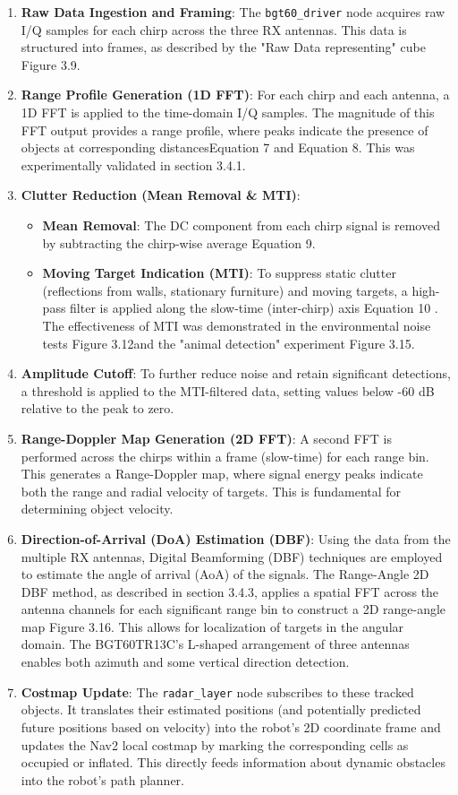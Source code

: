 \begin{itemize}
\begin{enumerate}
    \item \textbf{Raw Data Ingestion and Framing}: The \texttt{bgt60\_driver} node acquires raw I/Q samples for each chirp across the three RX antennas. This data is structured into frames, as described by the "Raw Data representing" cube Figure 3.9.
    \item \textbf{Range Profile Generation (1D FFT)}: For each chirp and each antenna, a 1D FFT is applied to the time-domain I/Q samples. The magnitude of this FFT output provides a range profile, where peaks indicate the presence of objects at corresponding distancesEquation 7 and Equation 8. This was experimentally validated in section 3.4.1.
    \item \textbf{Clutter Reduction (Mean Removal \& MTI)}:
    \begin{itemize}
        \item \textbf{Mean Removal}: The DC component from each chirp signal is removed by subtracting the chirp-wise average Equation 9.
        \item \textbf{Moving Target Indication (MTI)}: To suppress static clutter (reflections from walls, stationary furniture) and moving targets, a high-pass filter is applied along the slow-time (inter-chirp) axis Equation 10 . The effectiveness of MTI was demonstrated in the environmental noise tests Figure 3.12and the "animal detection" experiment Figure 3.15.
    \end{itemize}
    \item \textbf{Amplitude Cutoff}: To further reduce noise and retain significant detections, a threshold is applied to the MTI-filtered data, setting values below -60 dB relative to the peak to zero.
    \item \textbf{Range-Doppler Map Generation (2D FFT)}: A second FFT is performed across the chirps within a frame (slow-time) for each range bin. This generates a Range-Doppler map, where signal energy peaks indicate both the range and radial velocity of targets. This is fundamental for determining object velocity.
    \item \textbf{Direction-of-Arrival (DoA) Estimation (DBF)}: Using the data from the multiple RX antennas, Digital Beamforming (DBF) techniques are employed to estimate the angle of arrival (AoA) of the signals. The Range-Angle 2D DBF method, as described in section 3.4.3, applies a spatial FFT across the antenna channels for each significant range bin to construct a 2D range-angle map Figure 3.16. This allows for localization of targets in the angular domain. The BGT60TR13C's L-shaped arrangement of three antennas enables both azimuth and some vertical direction detection.
    \item \textbf{Costmap Update}: The \texttt{radar\_layer} node subscribes to these tracked objects. It translates their estimated positions (and potentially predicted future positions based on velocity) into the robot's 2D coordinate frame and updates the Nav2 local costmap by marking the corresponding cells as occupied or inflated. This directly feeds information about dynamic obstacles into the robot's path planner.
\end{enumerate}


\end{itemize}
